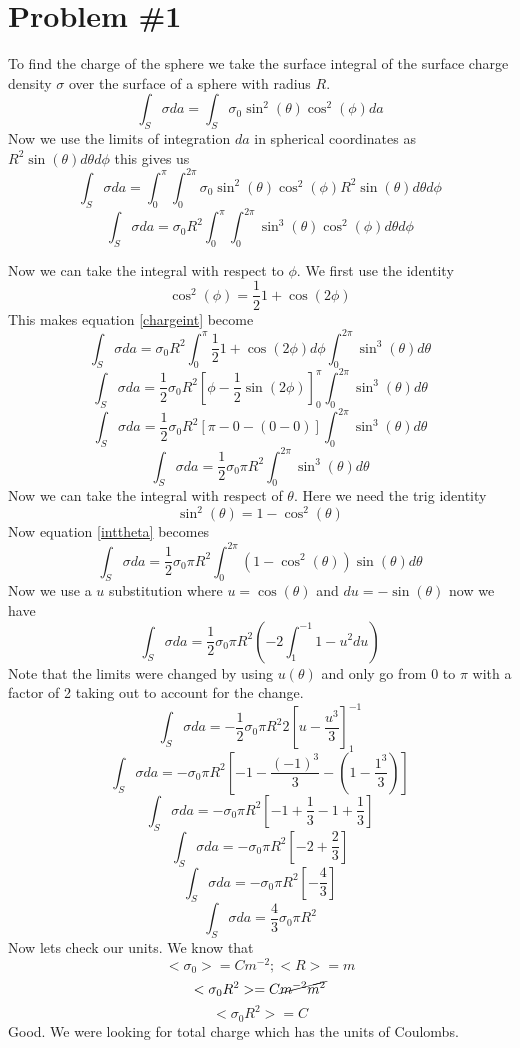 \documentclass[11pt]{article}
\numberwithin{equation}{section}
\begin{document}


\section{Problem \#1}
To find the charge of the sphere we take the surface integral of the surface charge density $\sigma$ over the surface of a sphere with radius $R$.
$$\int_S \sigma da = \int_S \sigma_0 \sin^2(\theta)\cos^2(\phi) da$$
Now we use the limits of integration $da$ in spherical coordinates as $R^2 \sin(\theta)d\theta d\phi$ this gives us
$$\int_S \sigma da = \int_0^{\pi}\int_0^{2\pi} \sigma_0 \sin^2(\theta)\cos^2(\phi) R^2 \sin(\theta)d\theta d\phi$$
\begin{equation}
\int_S \sigma da = \sigma_0 R^2\int_0^{\pi}\int_0^{2\pi}\sin^3(\theta)\cos^2(\phi) d\theta d\phi
\label{chargeint}
\end{equation}

Now we can take the integral with respect to $\phi$. We first use the identity $$\cos^2(\phi) = \frac{1}{2}1+\cos(2\phi)$$
This makes equation \ref{chargeint} become
$$\int_S \sigma da = \sigma_0 R^2\int_0^{\pi}\frac{1}{2}1+\cos(2\phi)d\phi\int_0^{2\pi}\sin^3(\theta) d\theta$$
$$\int_S \sigma da = \frac{1}{2}\sigma_0 R^2\left[\phi-\frac{1}{2}\sin(2\phi)\right]_{0}^{\pi}\int_0^{2\pi}\sin^3(\theta) d\theta$$
$$\int_S \sigma da = \frac{1}{2}\sigma_0 R^2\left[\pi - 0 - (0 - 0)\right]\int_0^{2\pi}\sin^3(\theta) d\theta$$
\begin{equation}
\int_S \sigma da = \frac{1}{2}\sigma_0 \pi R^2\int_0^{2\pi}\sin^3(\theta) d\theta
\label{inttheta}
\end{equation}
Now we can take the integral with respect of $\theta$. Here we need the trig identity 
$$\sin^2(\theta) = 1 - \cos^2(\theta)$$
Now equation \ref{inttheta} becomes
$$\int_S \sigma da = \frac{1}{2}\sigma_0 \pi R^2\int_0^{2\pi}(1-\cos^2(\theta))\sin(\theta) d\theta$$
Now we use a $u$ substitution where $u=\cos(\theta)$ and $du = -\sin(\theta)$ now we have
$$\int_S \sigma da = \frac{1}{2}\sigma_0 \pi R^2 \left(-2\int_1^{-1}1-u^2du\right)$$
Note that the limits were changed by using $u(\theta)$ and only go from $0$ to $\pi$ with a factor of 2 taking out to account for the change.
$$\int_S \sigma da = -\frac{1}{2}\sigma_0 \pi R^2 2\left[u-\frac{u^3}{3}\right]_{1}^{-1}$$
$$\int_S \sigma da = -\sigma_0 \pi R^2 \left[-1 - \frac{(-1)^3}{3} - \left(1 - \frac{1^3}{3}\right)\right]$$
$$\int_S \sigma da = -\sigma_0 \pi R^2 \left[-1 + \frac{1}{3} - 1 + \frac{1}{3}\right]$$
$$\int_S \sigma da = -\sigma_0 \pi R^2 \left[-2 + \frac{2}{3}\right]$$
$$\int_S \sigma da = -\sigma_0 \pi R^2 \left[-\frac{4}{3}\right]$$
$$\int_S \sigma da = \frac{4}{3}\sigma_0 \pi R^2 $$
Now lets check our units. We know that
$$<\sigma_0> = C m^{-2}; <R> = m$$
$$<\sigma_0 R^2> = C \cancel{m^{-2}m^2}$$
$$<\sigma_0 R^2> = C$$
Good. We were looking for total charge which has the units of Coulombs.
 
\end{document}
